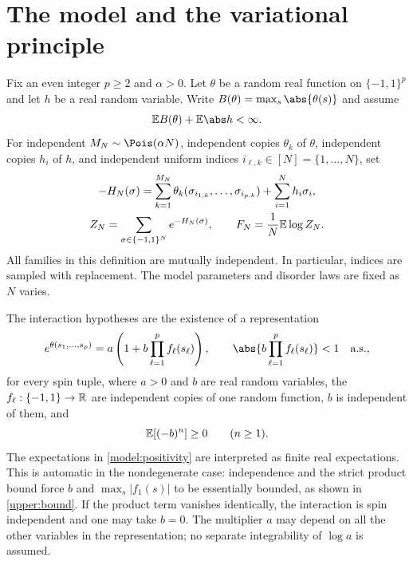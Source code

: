 \section{The model and the variational principle}\label{model:section}

Fix an even integer $p\ge2$ and $\alpha>0$. Let $\theta$ be a random real
function on $\{-1,1\}^p$ and let $h$ be a real random variable. Write
$B(\theta)=\max_s\abs{\theta(s)}$ and assume
\begin{equation}\label{model:integrability}
 \E B(\theta)+\E\abs h<\infty.
\end{equation}
For independent $M_N\sim\Pois(\alpha N)$, independent copies $\theta_k$ of
$\theta$, independent copies $h_i$ of $h$, and independent uniform indices
$i_{\ell,k}\in[N]=\{1,\ldots,N\}$, set
\begin{equation}\label{model:hamiltonian}
 \begin{gathered}
 -H_N(\sigma)=\sum_{k=1}^{M_N}
 \theta_k(\sigma_{i_{1,k}},\ldots,\sigma_{i_{p,k}})
 +\sum_{i=1}^N h_i\sigma_i,\\
 Z_N=\sum_{\sigma\in\{-1,1\}^N}e^{-H_N(\sigma)},
 \qquad F_N=\frac1N\mathbb E\log Z_N.
 \end{gathered}
\end{equation}
All families in this definition are mutually independent. In particular,
indices are sampled with replacement. The model parameters and disorder
laws are fixed as $N$ varies.

The interaction hypotheses are the existence of a representation
\begin{equation}\label{model:factorization}
 e^{\theta(s_1,\ldots,s_p)}
 =a\left(1+b\prod_{\ell=1}^p f_\ell(s_\ell)\right),
 \qquad
 \abs{b\prod_{\ell=1}^p f_\ell(s_\ell)}<1\quad\text{a.s.},
\end{equation}
for every spin tuple, where $a>0$ and $b$ are real random variables,
the $f_\ell:\{-1,1\}\to\mathbb R$ are independent copies of one random
function, $b$ is independent of them, and
\begin{equation}\label{model:positivity}
 \mathbb E[(-b)^n]\ge0\qquad(n\ge1).
\end{equation}
The expectations in \eqref{model:positivity} are interpreted as finite real
expectations. This is automatic in the nondegenerate case: independence
and the strict product bound force $b$ and $\max_s|f_1(s)|$ to be
essentially bounded, as shown in \cref{upper:bound}. If the product term
vanishes identically, the interaction is spin independent and one may
take $b=0$. The multiplier $a$ may depend on all the other variables in
the representation; no separate integrability of $\log a$ is assumed.


